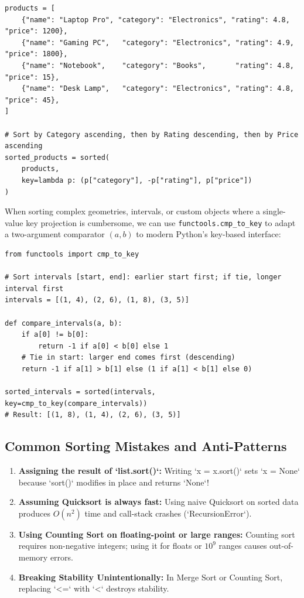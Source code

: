 \documentclass[11pt,a4paper]{article}
\begin{document}
\begin{lstlisting}[style=pythonstyle]
products = [
    {"name": "Laptop Pro", "category": "Electronics", "rating": 4.8, "price": 1200},
    {"name": "Gaming PC",   "category": "Electronics", "rating": 4.9, "price": 1800},
    {"name": "Notebook",    "category": "Books",       "rating": 4.8, "price": 15},
    {"name": "Desk Lamp",   "category": "Electronics", "rating": 4.8, "price": 45},
]

# Sort by Category ascending, then by Rating descending, then by Price ascending
sorted_products = sorted(
    products,
    key=lambda p: (p["category"], -p["rating"], p["price"])
)
\end{lstlisting}

\begin{examplebox}
When sorting complex geometries, intervals, or custom objects where a single-value key projection is cumbersome, we can use \lstinline{functools.cmp_to_key} to adapt a two-argument comparator $(a, b)$ to modern Python's key-based interface:
\end{examplebox}

\begin{lstlisting}[style=pythonstyle]
from functools import cmp_to_key

# Sort intervals [start, end]: earlier start first; if tie, longer interval first
intervals = [(1, 4), (2, 6), (1, 8), (3, 5)]

def compare_intervals(a, b):
    if a[0] != b[0]:
        return -1 if a[0] < b[0] else 1
    # Tie in start: larger end comes first (descending)
    return -1 if a[1] > b[1] else (1 if a[1] < b[1] else 0)

sorted_intervals = sorted(intervals, key=cmp_to_key(compare_intervals))
# Result: [(1, 8), (1, 4), (2, 6), (3, 5)]
\end{lstlisting}

\subsection{Common Sorting Mistakes and Anti-Patterns}
\begin{notebox}
\begin{enumerate}[itemsep=2pt]
    \item \textbf{Assigning the result of `list.sort()`:} Writing `x = x.sort()` sets `x = None` because `sort()` modifies in place and returns `None`!
    \item \textbf{Assuming Quicksort is always fast:} Using naive Quicksort on sorted data produces $O(n^2)$ time and call-stack crashes (`RecursionError`).
    \item \textbf{Using Counting Sort on floating-point or large ranges:} Counting sort requires non-negative integers; using it for floats or $10^9$ ranges causes out-of-memory errors.
    \item \textbf{Breaking Stability Unintentionally:} In Merge Sort or Counting Sort, replacing `<=` with `<` destroys stability.
\end{enumerate}
\end{notebox}
\end{document}
